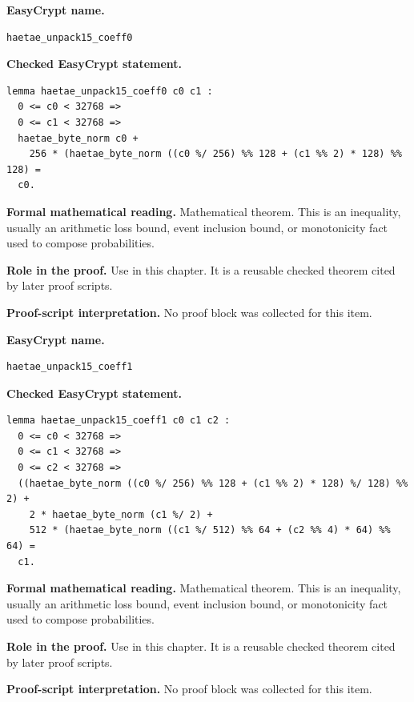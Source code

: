 \begin{formaltheorem}
\noindent\textbf{EasyCrypt name.}
\begin{lstlisting}[language=EasyCrypt,basicstyle=\ttfamily\scriptsize]
haetae_unpack15_coeff0
\end{lstlisting}
\noindent\textbf{Checked EasyCrypt statement.}
\begin{lstlisting}[language=EasyCrypt,basicstyle=\ttfamily\scriptsize]
lemma haetae_unpack15_coeff0 c0 c1 :
  0 <= c0 < 32768 =>
  0 <= c1 < 32768 =>
  haetae_byte_norm c0 +
    256 * (haetae_byte_norm ((c0 %/ 256) %% 128 + (c1 %% 2) * 128) %% 128) =
  c0.
\end{lstlisting}
\noindent\textbf{Formal mathematical reading.}
Mathematical theorem. This is an inequality, usually an arithmetic loss bound, event inclusion bound, or monotonicity fact used to compose probabilities.

\noindent\textbf{Role in the proof.}
Use in this chapter. It is a reusable checked theorem cited by later proof scripts.

\noindent\textbf{Proof-script interpretation.}
No proof block was collected for this item.

\end{formaltheorem}

\begin{formaltheorem}
\noindent\textbf{EasyCrypt name.}
\begin{lstlisting}[language=EasyCrypt,basicstyle=\ttfamily\scriptsize]
haetae_unpack15_coeff1
\end{lstlisting}
\noindent\textbf{Checked EasyCrypt statement.}
\begin{lstlisting}[language=EasyCrypt,basicstyle=\ttfamily\scriptsize]
lemma haetae_unpack15_coeff1 c0 c1 c2 :
  0 <= c0 < 32768 =>
  0 <= c1 < 32768 =>
  0 <= c2 < 32768 =>
  ((haetae_byte_norm ((c0 %/ 256) %% 128 + (c1 %% 2) * 128) %/ 128) %% 2) +
    2 * haetae_byte_norm (c1 %/ 2) +
    512 * (haetae_byte_norm ((c1 %/ 512) %% 64 + (c2 %% 4) * 64) %% 64) =
  c1.
\end{lstlisting}
\noindent\textbf{Formal mathematical reading.}
Mathematical theorem. This is an inequality, usually an arithmetic loss bound, event inclusion bound, or monotonicity fact used to compose probabilities.

\noindent\textbf{Role in the proof.}
Use in this chapter. It is a reusable checked theorem cited by later proof scripts.

\noindent\textbf{Proof-script interpretation.}
No proof block was collected for this item.

\end{formaltheorem}

